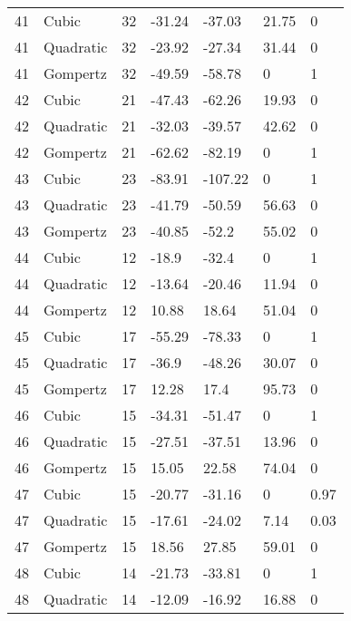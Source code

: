 \documentclass[11pt]{article}
\begin{document}
\begin{center}
\begin{longtable}{lllllll}
    41  & Cubic     & 32              & -31.24  & -37.03  & 21.75   & 0    \\
    41  & Quadratic & 32              & -23.92  & -27.34  & 31.44   & 0    \\
    41  & Gompertz  & 32              & -49.59  & -58.78  & 0       & 1    \\
    42  & Cubic     & 21              & -47.43  & -62.26  & 19.93   & 0    \\
    42  & Quadratic & 21              & -32.03  & -39.57  & 42.62   & 0    \\
    42  & Gompertz  & 21              & -62.62  & -82.19  & 0       & 1    \\
    43  & Cubic     & 23              & -83.91  & -107.22 & 0       & 1    \\
    43  & Quadratic & 23              & -41.79  & -50.59  & 56.63   & 0    \\
    43  & Gompertz  & 23              & -40.85  & -52.2   & 55.02   & 0    \\
    44  & Cubic     & 12              & -18.9   & -32.4   & 0       & 1    \\
    44  & Quadratic & 12              & -13.64  & -20.46  & 11.94   & 0    \\
    44  & Gompertz  & 12              & 10.88   & 18.64   & 51.04   & 0    \\
    45  & Cubic     & 17              & -55.29  & -78.33  & 0       & 1    \\
    45  & Quadratic & 17              & -36.9   & -48.26  & 30.07   & 0    \\
    45  & Gompertz  & 17              & 12.28   & 17.4    & 95.73   & 0    \\
    46  & Cubic     & 15              & -34.31  & -51.47  & 0       & 1    \\
    46  & Quadratic & 15              & -27.51  & -37.51  & 13.96   & 0    \\
    46  & Gompertz  & 15              & 15.05   & 22.58   & 74.04   & 0    \\
    47  & Cubic     & 15              & -20.77  & -31.16  & 0       & 0.97 \\
    47  & Quadratic & 15              & -17.61  & -24.02  & 7.14    & 0.03 \\
    47  & Gompertz  & 15              & 18.56   & 27.85   & 59.01   & 0    \\
    48  & Cubic     & 14              & -21.73  & -33.81  & 0       & 1    \\
    48  & Quadratic & 14              & -12.09  & -16.92  & 16.88   & 0    \\

\end{longtable}
\end{center}
\end{document}
